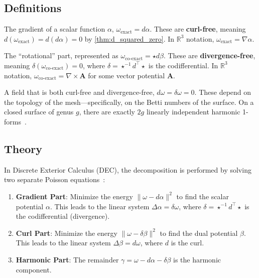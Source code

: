 \subsection{Definitions}
\begin{definition}\label{def:exact_component}
The gradient of a scalar function $\alpha$, $\omega_{\text{exact}} = d\alpha$. These are \textbf{curl-free}, meaning $d(\omega_{\text{exact}}) = d(d\alpha) = 0$ by \cref{thm:d_squared_zero}. In $\mathbb{R}^3$ notation, $\omega_{\text{exact}} = \nabla \alpha$.
\end{definition}

\begin{definition}\label{def:coexact_component}
The ``rotational'' part, represented as $\omega_{\text{co-exact}} = \star d\beta$. These are \textbf{divergence-free}, meaning $\delta(\omega_{\text{co-exact}}) = 0$, where $\delta = \star^{-1} d^\top \star$ is the codifferential. In $\mathbb{R}^3$ notation, $\omega_{\text{co-exact}} = \nabla \times \mathbf{A}$ for some vector potential $\mathbf{A}$.
\end{definition}

\begin{definition}\label{def:harmonic_component}
A field that is both curl-free and divergence-free, $d\omega = \delta\omega = 0$. These depend on the topology of the mesh---specifically, on the Betti numbers of the surface. On a closed surface of genus $g$, there are exactly $2g$ linearly independent harmonic 1-forms~\cite{polthier2003}.
\end{definition}

\subsection{Theory}
In Discrete Exterior Calculus (DEC), the decomposition is performed by solving two separate Poisson equations~\cite{crane2013}:
\begin{enumerate}
    \item \textbf{Gradient Part}: Minimize the energy $\| \omega - d\alpha \|^2$ to find the scalar potential $\alpha$. This leads to the linear system $\Delta \alpha = \delta \omega$, where $\delta = \star^{-1} d^\top \star$ is the codifferential (divergence).
    \item \textbf{Curl Part}: Minimize the energy $\| \omega - \delta\beta \|^2$ to find the dual potential $\beta$. This leads to the linear system $\Delta \beta = d \omega$, where $d$ is the curl.
    \item \textbf{Harmonic Part}: The remainder $\gamma = \omega - d\alpha - \delta\beta$ is the harmonic component.
\end{enumerate}

